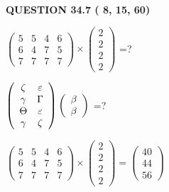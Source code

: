 \documentclass[12pt]{article}
\begin{document}
   
  
\vspace{0.2in}
  
{\textbf{\Large{QUESTION
34.7 
 (          8,         15,         60)
}}}
  
  
 
$ \left( \begin{array}{ccccccccc}
           5 & 
           5 & 
           4 & 
           6 \\ 
           6 & 
           4 & 
           7 & 
           5 \\ 
           7 & 
           7 & 
           7 & 
           7
\end{array}\right) \times
\left( \begin{array}{c}
           2 \\ 
           2 \\ 
           2 \\ 
           2
\end{array}\right) $ =?
 
 
$  %
 \left( \begin{array}
 {
 c
 c
 }
                    \zeta & 
 \varepsilon \\ 
 \gamma & 
 \Gamma \\ 
 \Theta & 
 \varepsilon \\ 
 \gamma & 
                    \zeta
 \end{array} \right)
 \left( \begin{array}
 {
 c
 }
 \beta \\ 
 \beta
 \end{array} \right)
$ =?
 
 
 
\noindent{}
 
 

 
$\left( \begin{array}{ccccccccccccccc}
           5 & 
           5 & 
           4 & 
           6 \\ 
           6 & 
           4 & 
           7 & 
           5 \\ 
           7 & 
           7 & 
           7 & 
           7
\end{array}\right) \times
\left( \begin{array}{c}
           2 \\ 
           2 \\ 
           2 \\ 
           2
\end{array}\right)  =
\left( \begin{array}{c}
          40 \\ 
          44 \\ 
          56
\end{array}\right)  $
 
\end{document}
